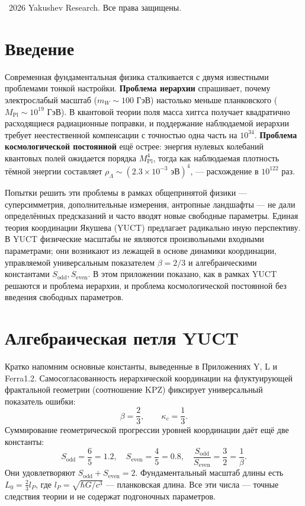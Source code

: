 \documentclass[11pt,a4paper]{article}
\theoremstyle{remark}
\begin{document}
	\vspace{0.5cm}
	\noindent
	\textcopyright\ 2026 Yakushev Research. Все права защищены.
	
	\tableofcontents
	\newpage
	
	\section{Введение}
	
	Современная фундаментальная физика сталкивается с двумя известными проблемами тонкой настройки. \textbf{Проблема иерархии} спрашивает, почему электрослабый масштаб (\(m_W \sim 100\) ГэВ) настолько меньше планковского (\(M_{\mathrm{Pl}} \sim 10^{19}\) ГэВ). В квантовой теории поля масса хиггса получает квадратично расходящиеся радиационные поправки, и поддержание наблюдаемой иерархии требует неестественной компенсации с точностью одна часть на \(10^{34}\). \textbf{Проблема космологической постоянной} ещё острее: энергия нулевых колебаний квантовых полей ожидается порядка \(M_{\mathrm{Pl}}^4\), тогда как наблюдаемая плотность тёмной энергии составляет \(\rho_\Lambda \sim (2.3 \times 10^{-3} \text{ эВ})^4\), — расхождение в \(10^{122}\) раз.
	
	Попытки решить эти проблемы в рамках общепринятой физики — суперсимметрия, дополнительные измерения, антропные ландшафты — не дали определённых предсказаний и часто вводят новые свободные параметры. Единая теория координации Якушева (YUCT) предлагает радикально иную перспективу. В YUCT физические масштабы не являются произвольными входными параметрами; они возникают из лежащей в основе динамики координации, управляемой универсальным показателем \(\beta = 2/3\) и алгебраическими константами \(S_{\mathrm{odd}}, S_{\mathrm{even}}\). В этом приложении показано, как в рамках YUCT решаются и проблема иерархии, и проблема космологической постоянной без введения свободных параметров.
	
	\section{Алгебраическая петля YUCT}
	
	Кратко напомним основные константы, выведенные в Приложениях Y, L и Ferra1.2. Самосогласованность иерархической координации на флуктуирующей фрактальной геометрии (соотношение KPZ) фиксирует универсальный показатель ошибки:
	\begin{equation}
		\beta = \frac{2}{3}, \qquad \kappa_c = \frac{1}{3}.
	\end{equation}
	Суммирование геометрической прогрессии уровней координации даёт ещё две константы:
	\begin{equation}
		S_{\mathrm{odd}} = \frac{6}{5} = 1.2, \quad S_{\mathrm{even}} = \frac{4}{5} = 0.8, \quad \frac{S_{\mathrm{odd}}}{S_{\mathrm{even}}} = \frac{3}{2} = \frac{1}{\beta}.
	\end{equation}
	Они удовлетворяют \(S_{\mathrm{odd}} + S_{\mathrm{even}} = 2\). Фундаментальный масштаб длины есть \(L_0 = \frac{2}{3} l_P\), где \(l_P = \sqrt{\hbar G / c^3}\) — планковская длина. Все эти числа — точные следствия теории и не содержат подгоночных параметров.
	
\end{document}
